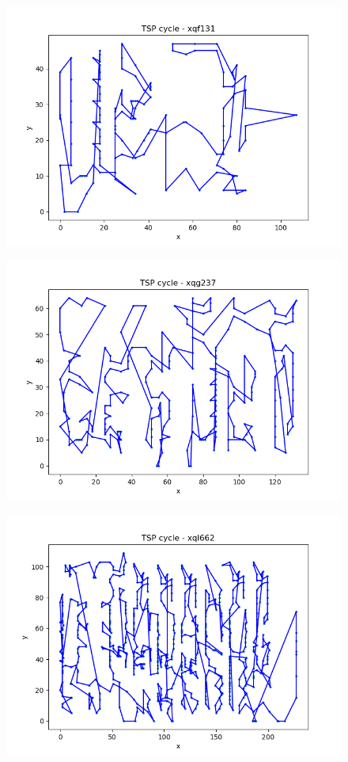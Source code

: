 \documentclass[12pt]{article}
\begin{document}
\begin{figure}[h]
    \centering
    \includegraphics[width=0.8\linewidth]{img/xqf131.png}
    \label{fig:xqf131}
\end{figure}

\begin{figure}[h]
    \centering
    \includegraphics[width=0.8\linewidth]{img/xqg237.png}
    \label{fig:xqg237}
\end{figure}

\begin{figure}[h]
    \centering
    \includegraphics[width=0.8\linewidth]{img/xql662.png}
    \label{fig:xql662}
\end{figure}
\end{document}
